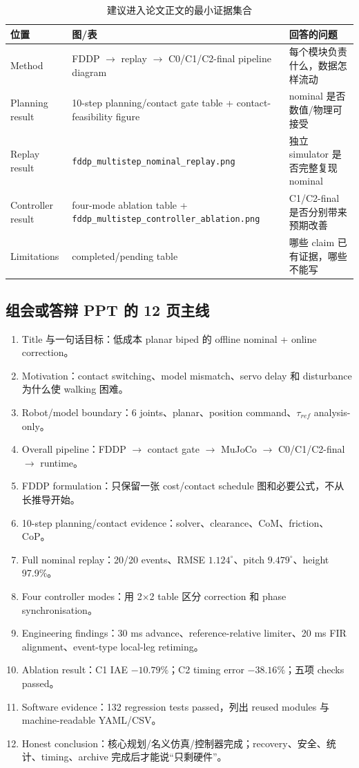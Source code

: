 \documentclass[UTF8,11pt,a4paper]{ctexart}
\newcommand{\code}[1]{\texttt{#1}}
\begin{document}
\begin{table}[htbp]
\centering
\caption{建议进入论文正文的最小证据集合}
\begin{tabularx}{\linewidth}{@{}p{3.1cm}X X@{}}
\toprule
位置 & 图/表 & 回答的问题 \\
\midrule
Method & FDDP $\rightarrow$ replay $\rightarrow$ C0/C1/C2-final pipeline diagram & 每个模块负责什么，数据怎样流动 \\
Planning result & 10-step planning/contact gate table + contact-feasibility figure & nominal 是否数值/物理可接受 \\
Replay result & \code{fddp\_multistep\_nominal\_replay.png} & 独立 simulator 是否完整复现 nominal \\
Controller result & four-mode ablation table + \code{fddp\_multistep\_controller\_ablation.png} & C1/C2-final 是否分别带来预期改善 \\
Limitations & completed/pending table & 哪些 claim 已有证据，哪些不能写 \\
\bottomrule
\end{tabularx}
\end{table}

\subsection{组会或答辩 PPT 的 12 页主线}

\begin{enumerate}
 \item Title 与一句话目标：低成本 planar biped 的 offline nominal + online correction。
 \item Motivation：contact switching、model mismatch、servo delay 和 disturbance 为什么使 walking 困难。
 \item Robot/model boundary：6 joints、planar、position command、$\tau_{ref}$ analysis-only。
 \item Overall pipeline：FDDP $\rightarrow$ contact gate $\rightarrow$ MuJoCo $\rightarrow$ C0/C1/C2-final $\rightarrow$ runtime。
 \item FDDP formulation：只保留一张 cost/contact schedule 图和必要公式，不从长推导开始。
 \item 10-step planning/contact evidence：solver、clearance、CoM、friction、CoP。
 \item Full nominal replay：20/20 events、RMSE $1.124^\circ$、pitch $9.479^\circ$、height 97.9\%。
 \item Four controller modes：用 2$\times$2 table 区分 correction 和 phase synchronisation。
 \item Engineering findings：30 ms advance、reference-relative limiter、20 ms FIR alignment、event-type local-leg retiming。
 \item Ablation result：C1 IAE $-10.79\%$；C2 timing error $-38.16\%$；五项 checks passed。
 \item Software evidence：132 regression tests passed，列出 reused modules 与 machine-readable YAML/CSV。
 \item Honest conclusion：核心规划/名义仿真/控制器完成；recovery、安全、统计、timing、archive 完成后才能说“只剩硬件”。
\end{enumerate}
\end{document}
